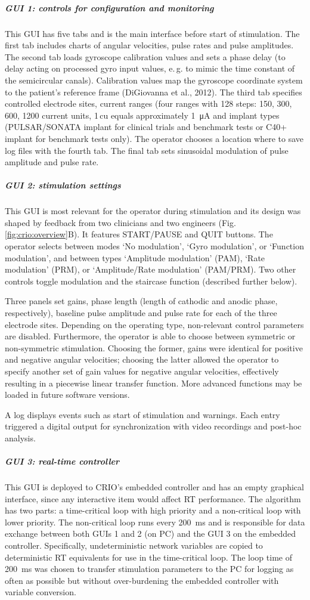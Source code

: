 \subparagraph{GUI 1: controls for configuration and monitoring}
This GUI has five tabs and is the main interface before start of stimulation. The first tab includes charts of angular velocities, pulse rates and pulse amplitudes. The second tab loads gyroscope calibration values and sets a phase delay (to delay acting on processed gyro input values, e.\,g. to mimic the time constant of the semicircular canals). Calibration values map the gyroscope coordinate system to the patient’s reference frame (DiGiovanna et al., 2012). The third tab specifies controlled electrode sites, current ranges (four ranges with 128 steps: 150, 300, 600, 1200 current units, 1\,cu equals approximately \SI{1}{\micro\ampere} and implant types (PULSAR/SONATA implant for clinical trials and benchmark tests or C40+ implant for benchmark tests only). The operator chooses a location where to save log files with the fourth tab. The final tab sets sinusoidal modulation of pulse amplitude and pulse rate.

\subparagraph{GUI 2: stimulation settings}
This GUI is most relevant for the operator during stimulation and its design was shaped by feedback from two clinicians and two engineers (Fig.\,\ref{fig:crio:overview}B). It features START/PAUSE and QUIT buttons. The operator selects between modes ‘No modulation’, ‘Gyro modulation’, or ‘Function modulation’, and between types ‘Amplitude modulation’ (PAM), ‘Rate modulation’ (PRM), or ‘Amplitude/Rate modulation’ (PAM/PRM). Two other controls toggle modulation and the staircase function (described further below). 

	Three panels set gains, phase length (length of cathodic and anodic phase, respectively), baseline pulse amplitude and pulse rate for each of the three electrode sites. Depending on the operating type, non-relevant control parameters are disabled. Furthermore, the operator is able to choose between symmetric or non-symmetric stimulation. Choosing the former, gains were identical for positive and negative angular velocities; choosing the latter allowed the operator to specify another set of gain values for negative angular velocities, effectively resulting in a piecewise linear transfer function. More advanced functions may be loaded in future software versions. 
	
	A log displays events such as start of stimulation and warnings. Each entry triggered a digital output for synchronization with video recordings and post-hoc analysis.
	
\subparagraph{GUI 3: real-time controller}
This GUI is deployed to CRIO’s embedded controller and has an empty graphical interface, since any interactive item would affect RT performance. The algorithm has two parts: a time-critical loop with high priority and a non-critical loop with lower priority. The non-critical loop runs every \SI{200}{\milli\second} and is responsible for data exchange between both GUIs 1 and 2 (on PC) and the GUI 3 on the embedded controller. Specifically, undeterministic network variables are copied to deterministic RT equivalents for use in the time-critical loop. The loop time of \SI{200}{\milli\second} was chosen to transfer stimulation parameters to the PC for logging as often as possible but without over-burdening the embedded controller with variable conversion.

